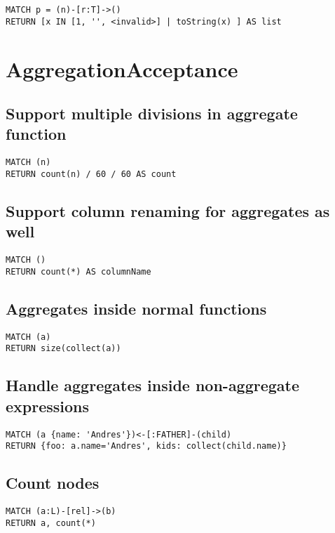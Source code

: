 \begin{lstlisting}
MATCH p = (n)-[r:T]->()
RETURN [x IN [1, '', <invalid>] | toString(x) ] AS list
\end{lstlisting}
\section{AggregationAcceptance}


\subsection{Support multiple divisions in aggregate function}

\begin{lstlisting}
MATCH (n)
RETURN count(n) / 60 / 60 AS count
\end{lstlisting}

\subsection{Support column renaming for aggregates as well}

\begin{lstlisting}
MATCH ()
RETURN count(*) AS columnName
\end{lstlisting}

\subsection{Aggregates inside normal functions}

\begin{lstlisting}
MATCH (a)
RETURN size(collect(a))
\end{lstlisting}

\subsection{Handle aggregates inside non-aggregate expressions}

\begin{lstlisting}
MATCH (a {name: 'Andres'})<-[:FATHER]-(child)
RETURN {foo: a.name='Andres', kids: collect(child.name)}
\end{lstlisting}

\subsection{Count nodes}

\begin{lstlisting}
MATCH (a:L)-[rel]->(b)
RETURN a, count(*)
\end{lstlisting}

